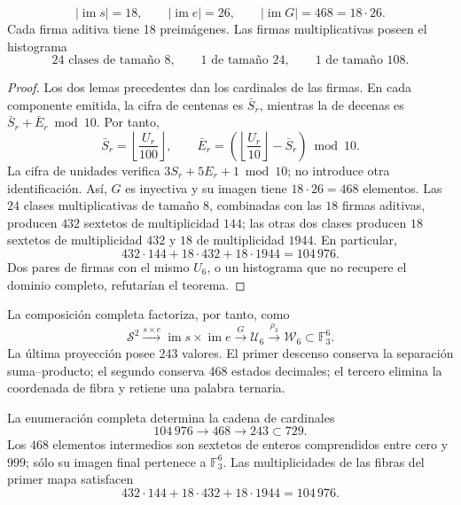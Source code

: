 \begin{theorem}
\label{pf84:E02-20}
\[
|\operatorname{im}s|=18,\qquad
|\operatorname{im}e|=26,\qquad
|\operatorname{im}G|=468=18\cdot26.
\]
Cada firma aditiva tiene 18 preimágenes. Las firmas multiplicativas poseen
el histograma
\[
24\text{ clases de tamaño }8,\qquad
1\text{ de tamaño }24,\qquad
1\text{ de tamaño }108.
\]
\end{theorem}
\begin{proof}
Los dos lemas precedentes dan los cardinales de las firmas. En cada componente
emitida, la cifra de centenas es \(\bar S_r\), mientras la de decenas es
\(\bar S_r+\bar E_r\bmod10\). Por tanto,
\[
 \bar S_r=\left\lfloor\frac{U_r}{100}\right\rfloor,\qquad
 \bar E_r=
 \left(\left\lfloor\frac{U_r}{10}\right\rfloor-\bar S_r\right)\bmod10.
\]
La cifra de unidades verifica \(3S_r+5E_r+1\bmod10\); no introduce otra
identificación. Así, \(G\) es inyectiva y su imagen tiene
\(18\cdot26=468\) elementos. Las \(24\) clases multiplicativas de tamaño
\(8\), combinadas con las \(18\) firmas aditivas, producen \(432\) sextetos
de multiplicidad \(144\); las otras dos clases producen \(18\) sextetos de
multiplicidad \(432\) y \(18\) de multiplicidad \(1944\). En particular,
\[
 432\cdot144+18\cdot432+18\cdot1944=104\,976.
\]
Dos pares de firmas con el mismo \(U_6\), o un histograma que no recupere el
dominio completo, refutarían el teorema.
\end{proof}

La composición completa factoriza, por tanto, como
\[
\mathcal S^2\xrightarrow{s\times e}
\operatorname{im}s\times\operatorname{im}e
\xrightarrow{G}\mathcal U_6
\xrightarrow{\rho_3}\mathcal W_6\subset\mathbb F_3^6.
\]
La última proyección posee 243 valores. El primer descenso conserva la
separación suma--producto; el segundo conserva 468 estados decimales; el
tercero elimina la coordenada de fibra y retiene una palabra ternaria.

\begin{corollary}
\label{cor:censo-proyeccion-observable}
\label{pf84:E02-21}
La enumeración completa determina la cadena de cardinales
\[
 104\,976\longrightarrow468\longrightarrow243\subset729.
\]
Los \(468\) elementos intermedios son sextetos de enteros comprendidos entre
cero y \(999\); sólo su imagen final pertenece a \(\mathbb F_3^6\). Las
multiplicidades de las fibras del primer mapa satisfacen
\[
 432\cdot144+18\cdot432+18\cdot1944=104\,976.
\]
\end{corollary}

